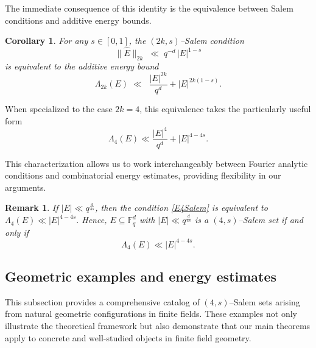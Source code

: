 \documentclass[11pt]{article}
\newtheorem{corollary}[theorem]{Corollary}
\newtheorem{remark}[theorem]{Remark}
\begin{document}
The immediate consequence of this identity is the equivalence between Salem conditions and additive energy bounds.
\begin{corollary}\label{cor:euivalence-Salem-bound}
	For any $s\in[0,1]$, the $(2k, s)$--Salem condition
	\begin{equation*}
		\|\widehat{E}\|_{2k}
		\;\ll\; q^{-d }\,|E|^{1-s}
	\end{equation*}
	is equivalent to the additive energy bound
	\begin{equation*}
		\Lambda_{2k}(E)
		\;\ll\;
		\; \frac{|E|^{2k}}{q^d}+ |E|^{2k(1-s)}.
	\end{equation*}
\end{corollary}

When specialized to the case $2k = 4$, this equivalence takes the particularly useful form
\begin{equation}\label{E4Salem}
\Lambda_4(E) \ll \frac{|E|^4}{q^d} + |E|^{4-4s}.
\end{equation}

This characterization allows us to work interchangeably between Fourier analytic conditions and combinatorial energy estimates, providing flexibility in our arguments.

\begin{remark} \label{GoodRemark}
 If  $|E|\ll q^{\frac{d}{4s}}$, then the condition  \eqref{E4Salem} is equivalent to $\Lambda_4(E)\ll |E|^{4-4s}.$
Hence,  $E\subseteq \mathbb F_q^d$ with $|E|\ll q^{\frac{d}{4s}}$ is a $(4, s)$--Salem set  if and only if \[\Lambda_4(E)\ll |E|^{4-4s}.\]
\end{remark}   


\subsection{Geometric examples and energy estimates}
This subsection provides a comprehensive catalog of $(4,s)$--Salem sets arising from natural geometric configurations in finite fields. These examples not only illustrate the theoretical framework but also demonstrate that our main theorems apply to concrete and well-studied objects in finite field geometry.
\end{document}
